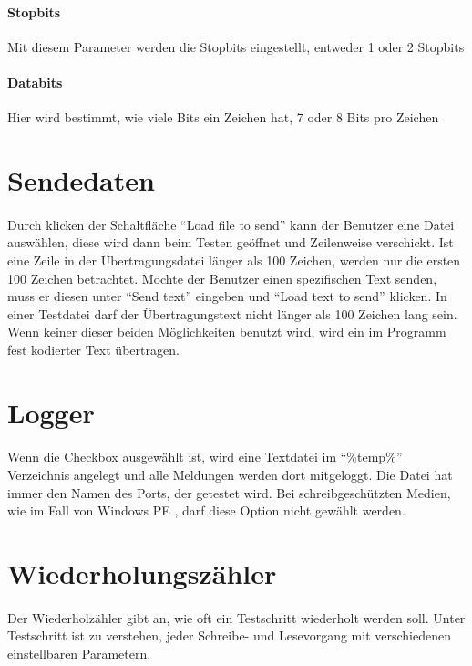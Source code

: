 \paragraph{Stopbits} Mit diesem Parameter werden die Stopbits eingestellt, entweder 1 oder 2 Stopbits
\paragraph{Databits} Hier wird bestimmt, wie viele Bits ein Zeichen hat, 7 oder 8 Bits pro Zeichen

\section{Sendedaten}
\paragraph{}
Durch klicken der Schaltfläche "`Load file to send"' kann der Benutzer eine Datei auswählen, diese wird dann beim Testen geöffnet und Zeilenweise verschickt. Ist eine Zeile in der Übertragungsdatei länger als 100 Zeichen, werden nur die ersten 100 Zeichen betrachtet. Möchte der Benutzer einen spezifischen Text senden, muss er diesen unter "`Send text"' eingeben und "`Load text to send"' klicken. In einer Testdatei darf der Übertragungstext nicht länger als 100 Zeichen lang sein. Wenn keiner dieser beiden Möglichkeiten benutzt wird, wird ein im Programm fest kodierter Text übertragen.

\section{Logger}
\paragraph{}
Wenn die Checkbox ausgewählt ist, wird eine Textdatei im "`\%temp\%"' Verzeichnis angelegt und alle Meldungen werden dort mitgeloggt. Die Datei hat immer den Namen des Ports, der getestet wird. Bei schreibgeschützten Medien, wie im Fall von Windows PE , darf diese Option nicht gewählt werden.


\section{Wiederholungszähler}
\paragraph{}
Der Wiederholzähler gibt an, wie oft ein Testschritt wiederholt werden soll. Unter Testschritt ist zu verstehen, jeder Schreibe- und Lesevorgang mit verschiedenen einstellbaren Parametern.


